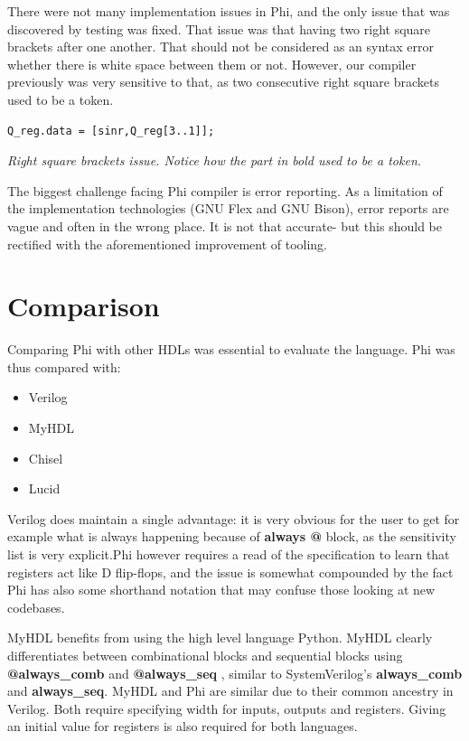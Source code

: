 \documentclass[10pt, two column]{article}
\theoremstyle{definition}
\begin{document}
There were not many implementation issues in Phi, and the only issue that was discovered by testing was fixed. That issue was that having two right square brackets after one another. That should not be considered as an syntax error whether there is white space between them or not. However, our compiler previously was very sensitive to that, as two consecutive right square brackets used to be a token.\newline

\begin{lstlisting}
Q_reg.data = [sinr,Q_reg[3..1]];
\end{lstlisting}
\begin{center}
\textit{Right square brackets issue. Notice how the part in bold used to be a token.}
\end{center}


The biggest challenge facing Phi compiler is error reporting. As a limitation of the implementation technologies (GNU Flex and GNU Bison), error reports are vague and often in the wrong place. It is not that accurate- but this should be rectified with the aforementioned improvement of tooling.

\section{Comparison}
Comparing Phi with other HDLs  was essential to evaluate the language. Phi was thus compared with:
\begin{itemize}
	\item Verilog
	\item MyHDL
	\item Chisel 
	\item Lucid
\end{itemize}

Verilog does maintain a single advantage: it is very obvious for the user to get for example what is always happening because of \textbf{always @} block, as the sensitivity list is very explicit.Phi however requires a read of the specification to learn that registers act like D flip-flops, and the issue is somewhat compounded by the fact Phi  has also some shorthand notation that may confuse those looking at new codebases.\newline

MyHDL benefits from using the high level language Python\cite{MyHDLmanual_2018}. MyHDL clearly differentiates between combinational blocks and sequential blocks using \textbf{@always\_comb} and \textbf{@always\_seq} \cite{MyHDLmanual_2018}, similar to SystemVerilog’s \textbf{always\_comb} and \textbf{always\_seq}. MyHDL and Phi are similar due to their common ancestry in Verilog. Both require specifying width for inputs, outputs and registers. Giving an initial value for registers is also required for both languages.\newline
\end{document}
